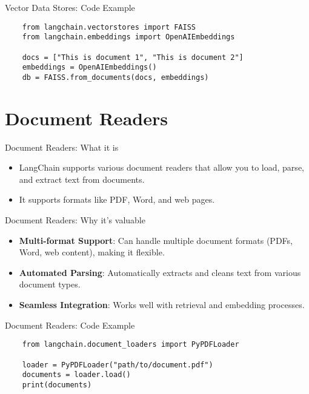 \documentclass{beamer}
\begin{document}
\begin{frame}[fragile]{Vector Data Stores: Code Example}
    \begin{verbatim}
    from langchain.vectorstores import FAISS
    from langchain.embeddings import OpenAIEmbeddings

    docs = ["This is document 1", "This is document 2"]
    embeddings = OpenAIEmbeddings()
    db = FAISS.from_documents(docs, embeddings)
    \end{verbatim}
\end{frame}

\section{Document Readers}

\begin{frame}{Document Readers: What it is}
    \begin{itemize}
        \item LangChain supports various document readers that allow you to load, parse, and extract text from documents.
        \item It supports formats like PDF, Word, and web pages.
    \end{itemize}
\end{frame}

\begin{frame}{Document Readers: Why it's valuable}
    \begin{itemize}
        \item \textbf{Multi-format Support}: Can handle multiple document formats (PDFs, Word, web content), making it flexible.
        \item \textbf{Automated Parsing}: Automatically extracts and cleans text from various document types.
        \item \textbf{Seamless Integration}: Works well with retrieval and embedding processes.
    \end{itemize}
\end{frame}

\begin{frame}[fragile]{Document Readers: Code Example}
    \begin{verbatim}
    from langchain.document_loaders import PyPDFLoader

    loader = PyPDFLoader("path/to/document.pdf")
    documents = loader.load()
    print(documents)
    \end{verbatim}
\end{frame}
\end{document}
